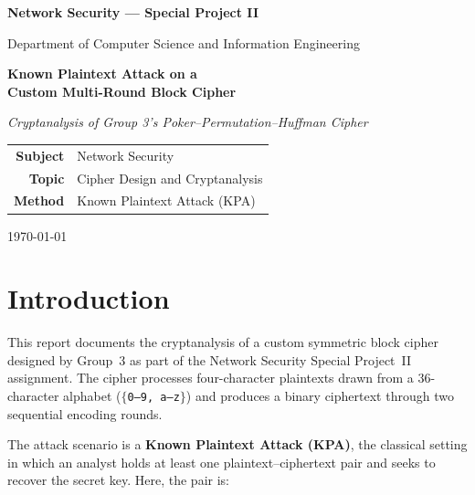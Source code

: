 \documentclass[12pt,a4paper]{article}
\begin{document}
\begin{titlepage}
    \centering
    \vspace*{2cm}
    {\Large \textbf{Network Security — Special Project II}\par}
    \vspace{0.4cm}
    {\large Department of Computer Science and Information Engineering\par}
    \vspace{2.5cm}
    {\Huge \textbf{Known Plaintext Attack on a\\[0.3em]
    Custom Multi-Round Block Cipher}\par}
    \vspace{1.5cm}
    {\large \textit{Cryptanalysis of Group 3's Poker–Permutation–Huffman Cipher}\par}
    \vspace{3cm}

    \begin{tabular}{rl}
        \textbf{Subject}   & Network Security \\[4pt]
        \textbf{Topic}     & Cipher Design and Cryptanalysis \\[4pt]
        \textbf{Method}    & Known Plaintext Attack (KPA) \\[4pt]
    \end{tabular}

    \vfill
    {\large \today\par}
\end{titlepage}

\tableofcontents
\newpage

\section{Introduction}

This report documents the cryptanalysis of a custom symmetric block cipher designed by Group~3 as part of the Network Security Special Project~II assignment. The cipher processes four-character plaintexts drawn from a 36-character alphabet ($\{$\texttt{0--9, a--z}$\}$) and produces a binary ciphertext through two sequential encoding rounds.

The attack scenario is a \textbf{Known Plaintext Attack (KPA)}, the classical setting in which an analyst holds at least one plaintext–ciphertext pair and seeks to recover the secret key. Here, the pair is:
\end{document}

